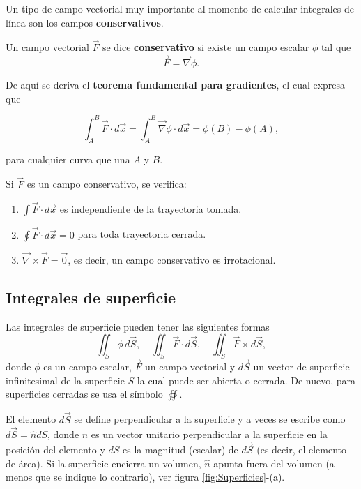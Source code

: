 Un tipo de campo vectorial muy importante al momento de calcular integrales de línea son los campos \textbf{conservativos}. 

Un campo vectorial $\vec{F}$ se dice \textbf{conservativo} si existe un campo escalar $\phi$ tal que
\begin{equation}
\vec{F} = \vec{\nabla} \phi.
\end{equation}

De aquí se deriva el \textbf{teorema fundamental para gradientes}, el cual expresa que
\begin{shaded}
 \begin{equation}
\int_A^B \vec{F} \cdot d\vec{x} = \int_A^B \Vec{\nabla} \phi \cdot d\Vec{x} = \phi(B) - \phi(A),
 \end{equation} 
\end{shaded}
para cualquier curva que una $A$ y $B$.

Si $\Vec{F}$ es un campo conservativo, se verifica:
\begin{enumerate}
\item $\int \vec{F} \cdot d\vec{x}$ es independiente de la trayectoria tomada.

\item $\oint\vec{F} \cdot d\vec{x} = 0$ para toda trayectoria cerrada.

\item $\vec{\nabla} \times \vec{F} = \vec{0}$, es decir, un campo conservativo es irrotacional.
\end{enumerate}

\subsection{Integrales de superficie}

Las integrales de superficie pueden tener las siguientes formas
\begin{equation}
\iint_S \phi\, d\vec{S}, \quad \iint_S \vec{F} \cdot d\vec{S}, \quad \iint_S \vec{F} \times d\vec{S},
\end{equation}
donde $\phi$ es un campo escalar, $\vec{F}$ un campo vectorial y $d\vec{S}$ un vector de superficie infinitesimal de la superficie $S$ la cual puede ser abierta o cerrada. De nuevo, para superficies cerradas se usa el símbolo $\oiint$.

El elemento $d\vec{S}$ se define perpendicular a la superficie y a veces se escribe como $d\vec{S} = \hat{n} dS$, donde $\hat{n}$ es un vector unitario perpendicular a la superficie en la posición del elemento y $dS$ es la magnitud (escalar) de $d\vec{S}$ (es decir, el elemento de área). Si la superficie encierra un volumen, $\hat{n}$ apunta fuera del volumen (a menos que se indique lo contrario), ver figura \ref{fig:Superficies}-(a).

